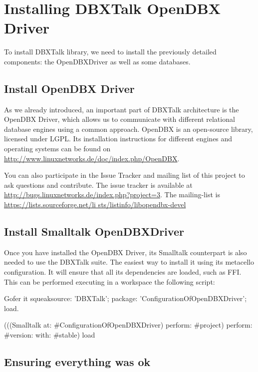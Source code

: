 \documentclass[a4paper,10pt,twoside]{book}
\begin{document}
\section{Installing DBXTalk OpenDBX Driver}
To install DBXTalk library, we need to install the previously detailed components: the OpenDBXDriver as well as some databases.

\subsection*{Install OpenDBX Driver}

As we already introduced, an important part of DBXTalk architecture is the OpenDBX Driver, which allows us
to communicate with different relational database engines using a common approach.  OpenDBX is an open-source library,
licensed under LGPL. Its installation instructions for different engines and operating systems can be found on \url{http://www.linuxnetworks.de/doc/index.php/OpenDBX}.


You can also participate in the Issue Tracker and mailing list of this project to ask questions and contribute. The issue tracker is available at \url{http://bugs.linuxnetworks.de/index.php?project=3}. The mailing-list is \url{https://lists.sourceforge.net/li sts/listinfo/libopendbx-devel}

\subsection*{Install Smalltalk OpenDBXDriver}
Once you have installed the OpenDBX Driver, its Smalltalk counterpart is also needed to use the DBXTalk suite.  The easiest way to install it using its metacello configuration. It will ensure that all its dependencies are loaded, such as FFI.  This can be performed executing in a workspace the following script:

\begin{code}{}
Gofer it
	squeaksource: 'DBXTalk';
	package: 'ConfigurationOfOpenDBXDriver';
	load.
	
(((Smalltalk at: #ConfigurationOfOpenDBXDriver) perform: #project) perform: #version: with: #stable) load
\end{code}

\subsection*{Ensuring everything was ok}
\end{document}
